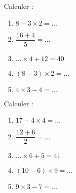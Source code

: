 \begin{minipage}{0.485\textwidth}

    Calculer :
    \begin{enumerate}
        \item
            \( 8-3\times 2=\ldots\)
        \item
            \( \dfrac{ 16+4 }{ 5 }=\ldots\)
        \item
            \( \ldots \times 4+12=40\)
        \item
            \( (8-3)\times 2=\ldots\)
        \item
            \(  4\times 3-4=\ldots \)
    \end{enumerate}

\end{minipage}
\begin{minipage}{0.485\textwidth}

    Calculer :
    \begin{enumerate}
        \item
            \( 17-4\times 4=\ldots\)
        \item
            \( \dfrac{ 12+6 }{ 2 }=\ldots\)
        \item
            \( \ldots \times 6+5=41\)
        \item
            \( (10-6)\times 9=\ldots\)
        \item
            \(  9\times 3-7=\ldots \)
    \end{enumerate}

\end{minipage}

